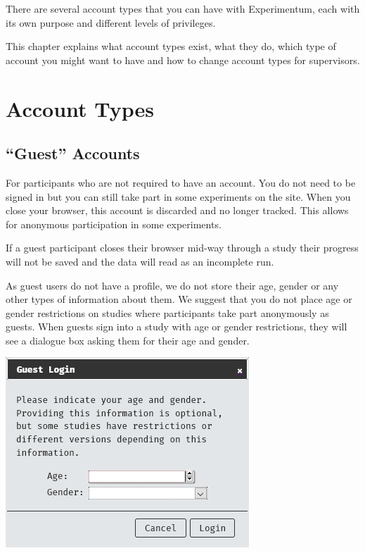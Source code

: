 \documentclass[]{book}
\begin{document}
There are several account types that you can have with Experimentum,
each with its own purpose and different levels of privileges.

This chapter explains what account types exist, what they do, which type
of account you might want to have and how to change account types for
supervisors.

\hypertarget{accounttypes}{\section{Account Types}\label{accounttypes}}

\subsection{\texorpdfstring{``Guest''
Accounts}{Guest Accounts}}\label{guest-accounts}

For participants who are not required to have an account. You do not
need to be signed in but you can still take part in some experiments on
the site. When you close your browser, this account is discarded and no
longer tracked. This allows for anonymous participation in some
experiments.

\begin{warning}
If a guest participant closes their browser mid-way through a study
their progress will not be saved and the data will read as an incomplete
run.
\end{warning}

As guest users do not have a profile, we do not store their age, gender
or any other types of information about them. We suggest that you do not
place age or gender restrictions on studies where participants take part
anonymously as guests. When guests sign into a study with age or gender
restrictions, they will see a dialogue box asking them for their age and
gender.

\includegraphics{images/screenshots/guest_dialogue.png}
\end{document}

